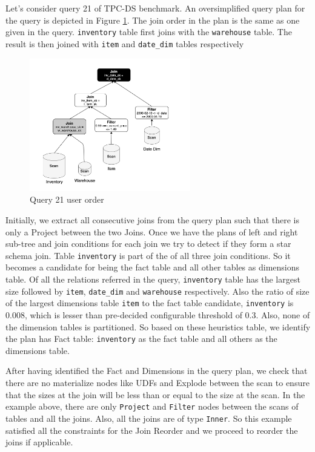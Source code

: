 Let's consider query 21 of TPC-DS benchmark. An oversimplified query plan for the query is depicted in Figure \ref{without-reorder}. The join order in the plan is the same as one given in the query. \texttt{inventory} table first joins with the \texttt{warehouse} table. The result is then joined with \texttt{item} and \texttt{date\_dim} tables respectively

\begin{figure}[ht]
\centerline{\includegraphics[width=7cm]{fig/without-reorder.png}}
\caption{Query 21 user order}
\label{without-reorder}
\end{figure}

Initially, we extract all consecutive joins from the query plan such that there is only a Project between the two Joins. Once we have the plans of left and right sub-tree and join conditions for each join we try to detect if they form a star schema join. Table \texttt{inventory} is part of the of all three join conditions. So it becomes a candidate for being the fact table and all other tables as dimensions table. Of all the relations referred in the query, \texttt{inventory} table has the largest size followed by \texttt{item}, \texttt{date\_dim} and \texttt{warehouse} respectively. Also the ratio of size of the largest dimensions table \texttt{item} to the fact table candidate, \texttt{inventory} is 0.008, which is lesser than pre-decided configurable threshold of 0.3. Also, none of the dimension tables is partitioned. So based on these heuristics table, we identify the plan has Fact table: \texttt{inventory} as the fact table and all others as the dimensions table.

After having identified the Fact and Dimensions in the query plan, we check that there are no materialize nodes like UDFs and Explode between the scan to ensure that the sizes at the join will be less than or equal to the size at the scan. In the example above, there are only \texttt{Project} and \texttt{Filter} nodes between the scans of tables and all the joins. Also, all the joins are of type \texttt{Inner}. So this example satisfied all the constraints for the Join Reorder and we proceed to reorder the joins if applicable.

